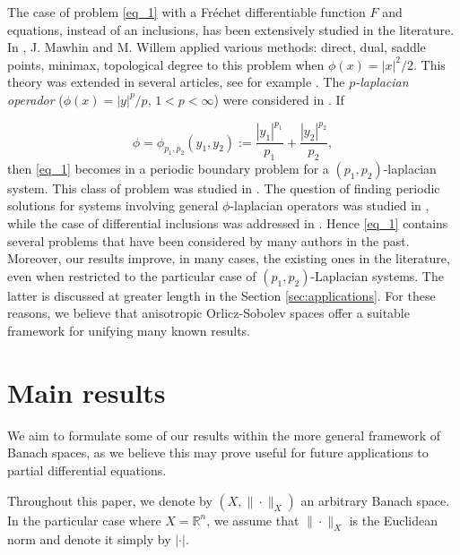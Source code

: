 \documentclass[twoside]{article}
\theoremstyle{definition}
\theoremstyle{plain}
\theoremstyle{remark}
\begin{document}
The case of problem \eqref{eq_1} with a Fréchet differentiable function $F$ and  equations, instead of an inclusions, has been extensively studied in the literature.
 In   \cite{mawhin2010critical},  J. Mawhin and M. Willem applied   various methods: direct, dual, saddle points,  minimax, topological degree to this problem when  $\phi(x)=|x|^2/2$. This theory was extended in several articles,  see for example \cite{tang1995periodic,tang1998periodic,tang2001periodic,wu1999periodic,zhao2004periodic}. The \emph{$p$-laplacian operador } ($\phi(x)=|y|^p/p$,  $1<p<\infty$) were considered in  \cite{Tang2010,tian2007periodic}.  If

\begin{equation}\label{eq:phip_1p_2}\phi=\phi_{p_1,p_2}(y_1,y_2):=\frac{|y_1|^{p_1}}{p_1}+\frac{|y_2|^{p_2}}{p_2},\end{equation}
then \eqref{eq_1}  becomes in a periodic boundary problem for a  $(p_1,p_2)$-laplacian system.  This class of problem was studied in
\cite{li2014periodic,pasca2010periodic,pacsca2010some,pasca2011some,pasca2016periodic,yang2012periodic,yang2013existence}.  The question of finding periodic solutions for systems involving general $\phi$-laplacian operators was studied in \cite{acinas2015some-2,Mazzone2019,acinas2022,acinas2019clarke,Acinas2017}, while the case of differential inclusions was addressed in \cite{Pasca2011, pacsca2007periodic,pacsca2008subharmonic,Ning2015}. Hence \eqref{eq_1}  contains several problems that have been considered by many authors in the past. Moreover, our results improve, in many cases, the existing ones in the literature, even when restricted to the particular case of $(p_1,p_2)$-Laplacian systems. The latter is discussed at greater length in the  Section \ref{sec:applications}. For these reasons, we believe that anisotropic Orlicz-Sobolev spaces offer a suitable framework for unifying many known results.



\section{Main results}
We aim to formulate some of our results within the more general framework of Banach spaces, as we believe this may prove useful for future applications to partial differential equations.

 Throughout this paper, we denote by $(X,\|\cdot\|_X)$ an arbitrary Banach space. In the particular case where $X = \mathbb{R}^n$, we assume that $\|\cdot\|_X$ is the Euclidean norm and  denote it simply by  $|\cdot|$. 
 
\end{document}
